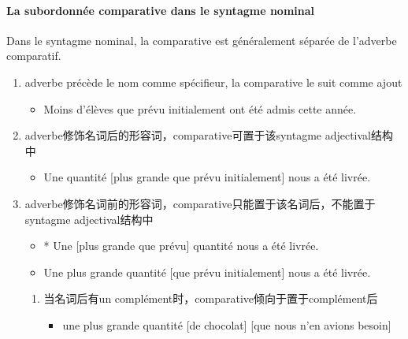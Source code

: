 \documentclass[UTF8]{report}
\begin{document}
\paragraph{La subordonnée comparative dans le syntagme nominal}
Dans le syntagme nominal, la comparative est généralement séparée de l’adverbe comparatif.
\begin{enumerate}
    \item adverbe précède le nom comme spécifieur, la comparative le suit comme ajout
    \begin{itemize}
        \item Moins d’élèves que prévu initialement ont été admis cette année.
    \end{itemize}
    \item adverbe修饰名词后的形容词，comparative可置于该syntagme adjectival结构中
    \begin{itemize}
        \item Une quantité [plus grande que prévu initialement] nous a été livrée.
    \end{itemize}
    \item adverbe修饰名词前的形容词，comparative只能置于该名词后，不能置于syntagme adjectival结构中
    \begin{itemize}
        \item * Une [plus grande que prévu] quantité nous a été livrée.
        \item Une plus grande quantité [que prévu initialement] nous a été livrée.
    \end{itemize}
    \begin{enumerate}
        \item 当名词后有un complément时，comparative倾向于置于complément后
        \begin{itemize}
            \item une plus grande quantité [de chocolat] [que nous n’en avions besoin]
        \end{itemize}
    \end{enumerate}
\end{enumerate}
\end{document}
